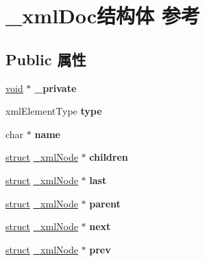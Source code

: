 \hypertarget{struct__xml_doc}{}\section{\+\_\+xml\+Doc结构体 参考}
\label{struct__xml_doc}
\subsection*{Public 属性}
\begin{DoxyCompactItemize}
\item 
\mbox{\label{struct__xml_doc_a50dd4d34840e069af0d520532ba3934b}} 
\hyperlink{interfacevoid}{void} $\ast$ {\bfseries \+\_\+private}
\item 
\mbox{\label{struct__xml_doc_aef9fa638a443a4fba932853a17948709}} 
xml\+Element\+Type {\bfseries type}
\item 
\mbox{\label{struct__xml_doc_a2548ebf8d04b23f6de8646769b05057d}} 
char $\ast$ {\bfseries name}
\item 
\mbox{\label{struct__xml_doc_ac7b84a52508e7ba5db5cdb28361bfcea}} 
\hyperlink{interfacestruct}{struct} \hyperlink{struct__xml_node}{\+\_\+xml\+Node} $\ast$ {\bfseries children}
\item 
\mbox{\label{struct__xml_doc_a8b4685c311eaf949512c6580da728b91}} 
\hyperlink{interfacestruct}{struct} \hyperlink{struct__xml_node}{\+\_\+xml\+Node} $\ast$ {\bfseries last}
\item 
\mbox{\label{struct__xml_doc_a68684ddadacb0eadb84aaf64bed3c22d}} 
\hyperlink{interfacestruct}{struct} \hyperlink{struct__xml_node}{\+\_\+xml\+Node} $\ast$ {\bfseries parent}
\item 
\mbox{\label{struct__xml_doc_a12d4bfc0972dc7f9ba3a67f7c4b94aae}} 
\hyperlink{interfacestruct}{struct} \hyperlink{struct__xml_node}{\+\_\+xml\+Node} $\ast$ {\bfseries next}
\item 
\mbox{\label{struct__xml_doc_ab4895482a4c47ae0e40b7dfadce94f3d}} 
\hyperlink{interfacestruct}{struct} \hyperlink{struct__xml_node}{\+\_\+xml\+Node} $\ast$ {\bfseries prev}

\end{DoxyCompactItemize}
